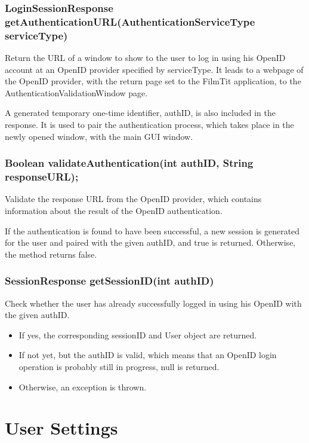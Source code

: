 \subsubsection{LoginSessionResponse getAuthenticationURL(AuthenticationServiceType serviceType)}

Return the URL of a window to show to the user to log in using his OpenID account at an OpenID provider specified by serviceType. It leads to a webpage of the OpenID provider, with the return page set to the FilmTit application, to the AuthenticationValidationWindow page.

A generated temporary one-time identifier, authID, is also included in the response. It is used to pair the authentication process, which takes place in the newly opened window, with the main GUI window.

\subsubsection{Boolean validateAuthentication(int authID, String responseURL);}

Validate the response URL from the OpenID provider, which contains information about the result of the OpenID authentication.

If the authentication is found to have been successful, a new session is generated for the user and paired with the given authID, and true is returned.
Otherwise, the method returns false.

\subsubsection{SessionResponse getSessionID(int authID)}

Check whether the user has already successfully logged in using his OpenID with the given authID.

\begin{itemize}
\item If yes, the corresponding sessionID and User object are returned.
\item If not yet, but the authID is valid, which means that an OpenID login operation is probably still in progress, null is returned.
\item Otherwise, an exception is thrown.
\end{itemize}

\section{User Settings}

